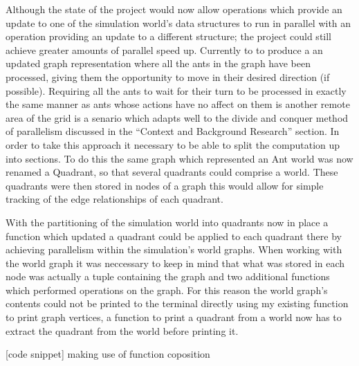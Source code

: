 \documentclass[main.tex]{subfiles}
\begin{document}

Although the state of the project would now allow operations which provide an update to one of the simulation world's data structures to run in parallel with an operation providing an update to a different structure; the project could still achieve greater amounts of parallel speed up. Currently to to produce a an updated graph representation where all the ants in the graph have been processed, giving them the opportunity to move in their desired direction (if possible). Requiring all the ants to wait for their turn to be processed in exactly the same manner as ants whose actions have no affect on them is another remote area of the grid is a senario which adapts well to the divide and conquer method of parallelism discussed in the ``Context and Background Research'' section. In order to take this approach it necessary to be able to split the computation up into sections. To do this the same graph which represented an Ant world was now renamed a Quadrant, so that several quadrants could comprise a world. These quadrants were then stored in nodes of a graph this would allow for simple tracking of the edge relationships of each quadrant.

With the partitioning of the simulation world into quadrants now in place a function which updated a quadrant could be applied to each quadrant there by achieving parallelism within the simulation's world graphs. When working with the world graph it was neccessary to keep in mind that what was stored in each node was actually a tuple containing the graph and two additional functions which performed operations on the graph. For this reason the world graph's contents could not be printed to the terminal directly using my existing function to print graph vertices, a function to print a quadrant from a world now has to extract the quadrant from the world before printing it.

[code snippet] making use of function coposition
\end{document}
